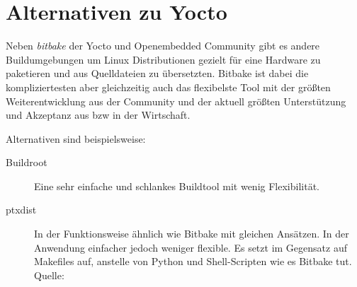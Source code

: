 \section{Alternativen zu Yocto}%
\label{sec:Alternativen zu Yocto}

Neben \textit{bitbake} der Yocto und  Openembedded Community gibt es andere
Buildumgebungen um Linux Distributionen gezielt für eine Hardware zu paketieren
und aus Quelldateien zu übersetzten. Bitbake ist dabei die kompliziertesten aber
gleichzeitig auch das flexibelste Tool mit der größten Weiterentwicklung aus der
Community und der aktuell größten Unterstützung und Akzeptanz aus bzw in der
Wirtschaft.

Alternativen sind beispielsweise:

\begin{description}
    \item[Buildroot] Eine sehr einfache und schlankes  Buildtool  mit wenig
        Flexibilität. \cite{buildroot}
    \item[ptxdist] In der Funktionsweise ähnlich wie Bitbake mit gleichen
        Ansätzen. In der Anwendung einfacher jedoch weniger flexible. Es setzt im
        Gegensatz auf Makefiles auf, anstelle von Python und Shell-Scripten wie
        es Bitbake tut. Quelle: \cite{ptxdist}
\end{description}








